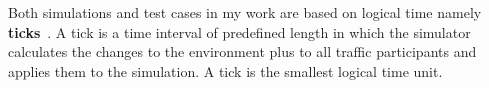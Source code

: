 Both simulations and test cases in my work are based on logical time namely \textbf{ticks}~\cite{tickrate}.
A tick is a time interval of predefined length in which the simulator calculates the changes to the environment plus to all traffic participants and applies them to the simulation.
A tick is the smallest logical time unit.
